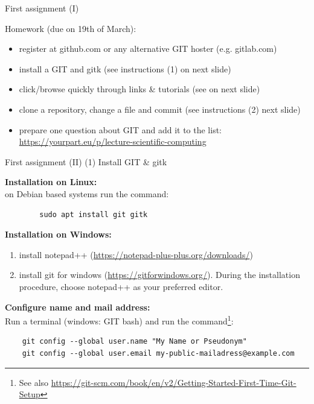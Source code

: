 \documentclass[10pt,color=usenames,dvipsnames]{beamer}
\begin{document}
\begin{frame}{First assignment (I)}

Homework (due on 19th of March):

\begin{itemize}
	\item register at github.com or any alternative GIT hoster (e.g. gitlab.com)
	\item install a GIT and gitk (see instructions (1) on next slide)
	\item click/browse quickly through links \& tutorials (see on next slide)
	\item clone a repository, change a file and commit (see instructions (2) next slide)
	\item prepare one question about GIT and add it to the list: \href{https://yourpart.eu/p/lecture-scientific-computing}{https://yourpart.eu/p/lecture-scientific-computing}

\end{itemize}


\end{frame}

\begin{frame}[fragile]{First assignment (II)}
	(1) Install GIT \& gitk

    {\bf Installation on Linux:}\\
    on Debian based systems run the command:

	\begin{verbatim}
	    sudo apt install git gitk
	\end{verbatim}

    {\bf Installation on Windows:}
    \begin{enumerate}
        \item install notepad++ (\href{https://notepad-plus-plus.org/downloads/}{https://notepad-plus-plus.org/downloads/})
        \item install git for windows
            (\href{https://gitforwindows.org/}{https://gitforwindows.org/}). During the
            installation procedure, choose notepad++ as your preferred editor.
    \end{enumerate}

    {\bf Configure name and mail address:}\\
    Run a terminal (windows: GIT bash) and run the command\footnote{
        See also
            \href{https://git-scm.com/book/en/v2/Getting-Started-First-Time-Git-Setup}
            {https://git-scm.com/book/en/v2/Getting-Started-First-Time-Git-Setup}
    }:
    {\small
        \begin{verbatim}
    git config --global user.name "My Name or Pseudonym"
    git config --global user.email my-public-mailadress@example.com
        \end{verbatim}
    }

\end{frame}
\end{document}
